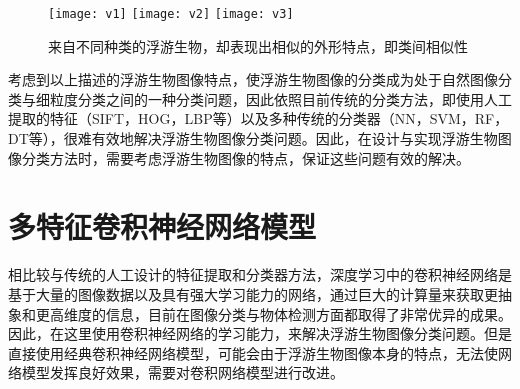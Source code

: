 \begin{figure}[H]
  \centering%
  \subcaptionbox{} %
    {\texttt{[image: v1]}}%
  \hspace{2em}%
  \subcaptionbox{}
      {\texttt{[image: v2]}}
  \hspace{2em}%
  \subcaptionbox{}
      {\texttt{[image: v3]}}
  \caption{来自不同种类的浮游生物，却表现出相似的外形特点，即类间相似性}
\end{figure}


考虑到以上描述的浮游生物图像特点，使浮游生物图像的分类成为处于自然图像分类与细粒度分类之间的一种分类问题，因此依照目前传统的分类方法，即使用人工提取的特征（SIFT，HOG，LBP等）以及多种传统的分类器（NN，SVM，RF，DT等），很难有效地解决浮游生物图像分类问题。因此，在设计与实现浮游生物图像分类方法时，需要考虑浮游生物图像的特点，保证这些问题有效的解决。%



\section{多特征卷积神经网络模型}

相比较与传统的人工设计的特征提取和分类器方法，深度学习中的卷积神经网络是基于大量的图像数据以及具有强大学习能力的网络，通过巨大的计算量来获取更抽象和更高维度的信息，目前在图像分类与物体检测方面都取得了非常优异的成果。因此，在这里使用卷积神经网络的学习能力，来解决浮游生物图像分类问题。但是直接使用经典卷积神经网络模型，可能会由于浮游生物图像本身的特点，无法使网络模型发挥良好效果，需要对卷积网络模型进行改进。

